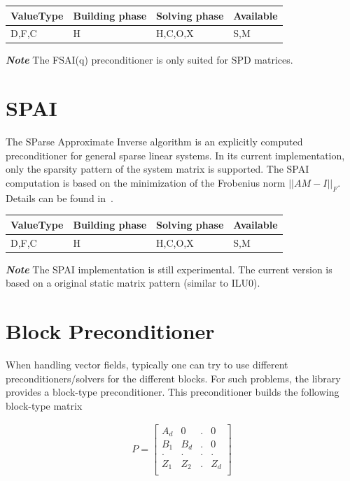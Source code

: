 \begin{table}[H]
\begin{tabular}{l|l|l|l}
\multicolumn{1}{c|}{ValueType} & Building phase & Solving phase & Available \\ \hline
D,F,C                          & H              & H,C,O,X       & S,M      
\end{tabular}
\end{table}



\textbf{\emph{Note}} The FSAI(q) preconditioner is only suited for SPD matrices.

\section{SPAI}

The SParse Approximate Inverse algorithm is an explicitly computed preconditioner for
general sparse linear systems. In its current implementation, only the sparsity pattern
of the system matrix is supported. The SPAI computation is based on the minimization of
the Frobenius norm $||AM - I||_F$. Details can be found in~\cite{grote}.

\begin{table}[H]
\begin{tabular}{l|l|l|l}
\multicolumn{1}{c|}{ValueType} & Building phase & Solving phase & Available \\ \hline
D,F,C                          & H              & H,C,O,X       & S,M      
\end{tabular}
\end{table}



\textbf{\emph{Note}} The SPAI implementation is still experimental. The current version is based on a original static matrix pattern (similar to ILU0).

\section{Block Preconditioner}

When handling vector fields, typically one can try to use different preconditioners/solvers for the different blocks. For such problems, the library provides a block-type preconditioner. This preconditioner builds the following block-type matrix

\begin{eqnarray}
P =\left[
\begin{array}{cccc}  
A_d & 0   & . & 0\\ 
B_1 & B_d & . & 0\\
.   & .   & . & .\\
Z_1 & Z_2 & . & Z_d\\
\end{array}\right]
\end{eqnarray}

